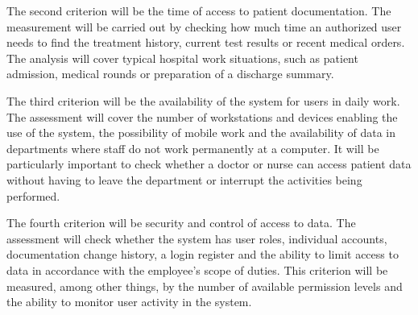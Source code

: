     The second criterion will be the time of access to patient documentation. The measurement will be carried out by checking how much time an authorized user needs to find the treatment history, current test results or recent medical orders. The analysis will cover typical hospital work situations, such as patient admission, medical rounds or preparation of a discharge summary.

    The third criterion will be the availability of the system for users in daily work. The assessment will cover the number of workstations and devices enabling the use of the system, the possibility of mobile work and the availability of data in departments where staff do not work permanently at a computer. It will be particularly important to check whether a doctor or nurse can access patient data without having to leave the department or interrupt the activities being performed.

    The fourth criterion will be security and control of access to data. The assessment will check whether the system has user roles, individual accounts, documentation change history, a login register and the ability to limit access to data in accordance with the employee's scope of duties. This criterion will be measured, among other things, by the number of available permission levels and the ability to monitor user activity in the system.
